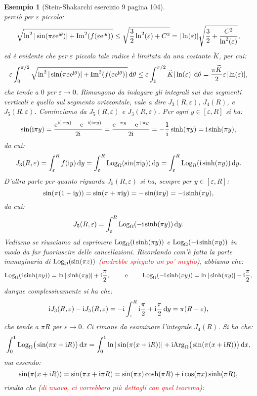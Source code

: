 \documentclass[11pt]{book}
\theoremstyle{Definizione}
\theoremstyle{TeoremaProposizioneLemmaCorollarioCongettura}
\theoremstyle{OsservazioneNotaEsempio}
\newtheorem{myes}{Esempio}[section]
\renewcommand{\Im}{\textup{Im}}
\newcommand{\Arg}[1][]{\textup{Arg}_{#1}}
\renewcommand{\i}{\textup{i}}
\newcommand{\e}{\textup{e}}
\renewcommand{\d}{\mathrm{d}}
\newcommand{\dx}{\,\d x}
\newcommand{\dy}{\,\d y}
\newcommand{\dtheta}{\, \d \theta}
\newcommand{\Log}[1][]{\textup{Log}_{#1}}
\begin{document}
\begin{myes}[Stein-Shakarchi esercizio 9 pagina 104]
$$$$
perciò per $\varepsilon$ piccolo:
$$
\sqrt{\ln^2|\sin(\pi \varepsilon\e^{\i\theta})|+\Im^2(f(\varepsilon\e^{\i\theta}))} \leq \sqrt{\frac{3}{2}\ln^2(\varepsilon) + C^2} = |\ln(\varepsilon)|\sqrt{\frac{3}{2}+ \frac{C^2}{\ln^2(\varepsilon)}}, 
$$
ed è evidente che per $\varepsilon$ piccolo tale radice è limitata da una costante $\widetilde{K}$, per cui:
$$
\varepsilon\int_{0}^{\pi/2} \sqrt{\ln^2|\sin(\pi \varepsilon\e^{\i\theta})|+\Im^2(f(\varepsilon\e^{\i\theta}))}\dtheta \leq \varepsilon\int_0^{\pi/2} \widetilde{K}|\ln(\varepsilon)|\dtheta = \frac{\pi\widetilde{K}}{2}\varepsilon|\ln(\varepsilon)|,
$$
che tende a $0$ per $\varepsilon \to 0$. Rimangono da indagare gli integrali sui due segmenti verticali e quello sul segmento orizzontale, vale a dire $J_3(R,\varepsilon)$, $J_4(R)$, e $J_5(R,\varepsilon)$. Cominciamo da $J_5(R,\varepsilon)$ e $J_3(R,\varepsilon)$. Per ogni $y\in [\varepsilon,R]$ si ha:
$$
\sin(\i \pi y) = \frac{\e^{\i(\i\pi y)}-\e^{-\i (\i \pi y)}}{2\i} = \frac{\e^{-\pi y}-\e^{+\pi y}}{2\i} = -\frac{1}{\i} \sinh(\pi y) = \i \sinh(\pi y),
$$
da cui:
$$
J_3(R,\varepsilon) = \int_{\varepsilon}^{R} f(\i y)\dy = \int_{\varepsilon}^{R} \Log[\Omega](\sin(\pi \i y))\dy = \int_{\varepsilon}^{R} \Log[\Omega](\i \sinh(\pi y))\dy.
$$
D'altra parte per quanto riguarda $J_5(R,\varepsilon)$ si ha, sempre per $y\in [\varepsilon,R]$:
$$
\sin(\pi (1+\i y)) = \sin(\pi +\pi \i y) = -\sin(\i \pi y) = -\i \sinh(\pi y),
$$
da cui:
$$
J_5(R,\varepsilon) = \int_{\varepsilon}^{R} \Log[\Omega](-\i \sinh(\pi y))\dy.
$$
Vediamo se riusciamo ad esprimere $\Log[\Omega](\i \sinh(\pi y))$ e $\Log[\Omega](-\i \sinh(\pi y))$ in modo da far fuoriuscire delle cancellazioni. Ricordando com'è fatta la parte immaginaria di $\Log[\Omega](\sin(\pi z))$ (\textcolor{red}{andrebbe spiegato un po' meglio}), abbiamo che:
$$
\Log[\Omega](\i \sinh(\pi y)) = \ln|\sinh(\pi y)| + \i \frac{\pi}{2},\qquad \textup{ e }\qquad\Log[\Omega](-\i \sinh(\pi y)) = \ln|\sinh(\pi y)| - \i \frac{\pi}{2},
$$
dunque complessivamente si ha che:
$$
\i J_3(R,\varepsilon) -\i J_5(R,\varepsilon) = -\i \int_{\varepsilon}^{R} \i \frac{\pi}{2}+\i \frac{\pi}{2}\dy  = \pi(R-\varepsilon),
$$
che tende a $\pi R$ per $\varepsilon \to 0$. Ci rimane da esaminare l'integrale $J_4(R)$. Si ha che:
$$
\int_0^{1} \Log[\Omega]\big(\sin(\pi x+\i R)\big)\dx = \int_{0}^{1} \ln|\sin(\pi (x+\i R))| + \i \Arg[\Omega]\big(\sin(\pi (x+\i R))\big)\dx,
$$
ma essendo:
$$
\sin(\pi(x+\i R)) = \sin(\pi x+\i \pi R) = \sin(\pi x)\cosh(\pi R)+\i \cos(\pi x)\sinh(\pi R),
$$
risulta che (\textcolor{red}{di nuovo, ci vorrebbero più dettagli con quel teorema}):

\end{myes}
\end{document}
